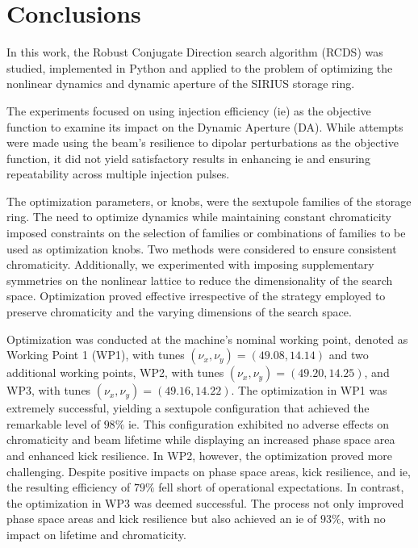 \chapter{Conclusions}

In this work, the Robust Conjugate Direction search algorithm (\gls*{RCDS}) was studied, implemented in Python and applied to the problem of optimizing the nonlinear dynamics and dynamic aperture of the SIRIUS storage ring.

The experiments focused on using injection efficiency (\gls*{ie}) as the objective function to examine its impact on the Dynamic Aperture (\gls*{DA}). While attempts were made using the beam's resilience to dipolar perturbations as the objective function, it did not yield satisfactory results in enhancing \gls*{ie} and ensuring repeatability across multiple injection pulses.

The optimization parameters, or knobs, were the sextupole families of the storage ring. The need to optimize dynamics while maintaining constant chromaticity imposed constraints on the selection of families or combinations of families to be used as optimization knobs. Two methods were considered to ensure consistent chromaticity. Additionally, we experimented with imposing supplementary symmetries on the nonlinear lattice to reduce the dimensionality of the search space. Optimization proved effective irrespective of the strategy employed to preserve chromaticity and the varying dimensions of the search space.

Optimization was conducted at the machine's nominal working point, denoted as Working Point 1 (\gls*{WP1}), with tunes $(\nu_x, \nu_y)=(49.08, 14.14)$ and two additional working points, \gls*{WP2}, with tunes $(\nu_x, \nu_y)=(49.20, 14.25)$, and \gls*{WP3}, with tunes $(\nu_x, \nu_y)=(49.16, 14.22)$. The optimization in WP1 was extremely successful, yielding a sextupole configuration that achieved the remarkable level of $98\%$ \gls*{ie}. This configuration exhibited no adverse effects on chromaticity and beam lifetime while displaying an increased phase space area and enhanced kick resilience. In \gls*{WP2}, however, the optimization proved more challenging. Despite positive impacts on phase space areas, kick resilience, and \gls*{ie}, the resulting efficiency of $79\%$ fell short of operational expectations. In contrast, the optimization in WP3 was deemed successful. The process not only improved phase space areas and kick resilience but also achieved an \gls*{ie} of $93\%$, with no impact on lifetime and chromaticity.

